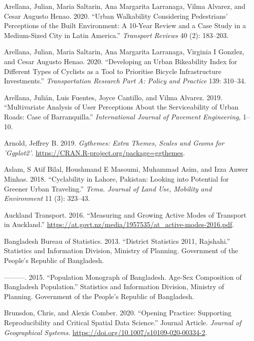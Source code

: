 \documentclass[]{elsarticle} %
\begin{document}
\leavevmode\hypertarget{ref-arellana2020urban}{}%
Arellana, Julian, Maria Saltarin, Ana Margarita Larranaga, Vilma
Alvarez, and Cesar Augusto Henao. 2020. ``Urban Walkability Considering
Pedestrians' Perceptions of the Built Environment: A 10-Year Review and
a Case Study in a Medium-Sized City in Latin America.'' \emph{Transport
Reviews} 40 (2): 183--203.

\leavevmode\hypertarget{ref-arellana2020developing}{}%
Arellana, Julian, Maria Saltarin, Ana Margarita Larranaga, Virginia I
Gonzlez, and Cesar Augusto Henao. 2020. ``Developing an Urban
Bikeability Index for Different Types of Cyclists as a Tool to
Prioritise Bicycle Infrastructure Investments.'' \emph{Transportation
Research Part A: Policy and Practice} 139: 310--34.

\leavevmode\hypertarget{ref-arellana2019multivariate}{}%
Arellana, Julián, Luis Fuentes, Joyce Cantillo, and Vilma Alvarez. 2019.
``Multivariate Analysis of User Perceptions About the Serviceability of
Urban Roads: Case of Barranquilla.'' \emph{International Journal of
Pavement Engineering}, 1--10.

\leavevmode\hypertarget{ref-Arnold2019ggthemes}{}%
Arnold, Jeffrey B. 2019. \emph{Ggthemes: Extra Themes, Scales and Geoms
for 'Ggplot2'}. \url{https://CRAN.R-project.org/package=ggthemes}.

\leavevmode\hypertarget{ref-aslam2018cyclability}{}%
Aslam, S Atif Bilal, Houshmand E Masoumi, Muhammad Asim, and Izza Anwer
Minhas. 2018. ``Cyclability in Lahore, Pakistan: Looking into Potential
for Greener Urban Traveling.'' \emph{Tema. Journal of Land Use, Mobility
and Environment} 11 (3): 323--43.

\leavevmode\hypertarget{ref-auckland2016at}{}%
Auckland Transport. 2016. ``Measuring and Growing Active Modes of
Transport in Auckland.''
\url{https://at.govt.nz/media/1957535/at_active-modes-2016.pdf}.

\leavevmode\hypertarget{ref-bangladesh2013raj}{}%
Bangladesh Bureau of Statistics. 2013. ``District Statistics 2011,
Rajshahi.'' Statistics and Information Division, Ministry of Planning.
Government of the People's Republic of Bangladesh.

\leavevmode\hypertarget{ref-bangladesh2015raj}{}%
---------. 2015. ``Population Monograph of Bangladesh. Age-Sex
Composition of Bangladesh Population.'' Statistics and Information
Division, Ministry of Planning. Government of the People's Republic of
Bangladesh.

\leavevmode\hypertarget{ref-Brunsdon2020opening}{}%
Brunsdon, Chris, and Alexis Comber. 2020. ``Opening Practice: Supporting
Reproducibility and Critical Spatial Data Science.'' Journal Article.
\emph{Journal of Geographical Systems}.
\url{https://doi.org/10.1007/s10109-020-00334-2}.
\end{document}
